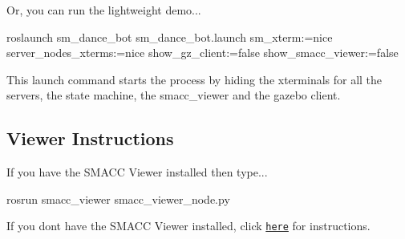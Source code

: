 Or, you can run the lightweight demo...


\begin{DoxyCode}
roslaunch sm\_dance\_bot sm\_dance\_bot.launch sm\_xterm:=nice server\_nodes\_xterms:=nice show\_gz\_client:=false
       show\_smacc\_viewer:=false
\end{DoxyCode}


This launch command starts the process by hiding the xterminals for all the servers, the state machine, the smacc\+\_\+viewer and the gazebo client.

\subsection*{Viewer Instructions}

If you have the S\+M\+A\+CC Viewer installed then type...


\begin{DoxyCode}
rosrun smacc\_viewer smacc\_viewer\_node.py
\end{DoxyCode}


If you don\textquotesingle{}t have the S\+M\+A\+CC Viewer installed, click \href{http://smacc.ninja/smacc-viewer/}{\tt here} for instructions. 